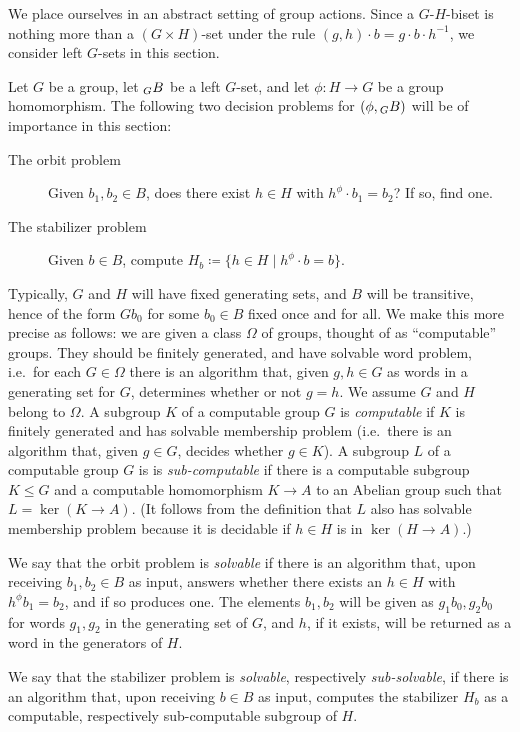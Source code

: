\documentclass{amsart}
\begin{document}
We place ourselves in an abstract setting of group actions. Since a
$G$-$H$-biset is nothing more than a $(G\times H)$-set under the rule
$(g,h)\cdot b=g\cdot b\cdot h^{-1}$, we consider left $G$-sets in this
section.

Let $G$ be a group, let $\subscript G B$ be a left $G$-set, and let
$\phi\colon H\to G$ be a group homomorphism. The following two
decision problems for $(\phi,\subscript G B)$ will be of importance in this
section:
\begin{description}
\item[The orbit problem] Given $b_1,b_2\in B$, does there exist $h\in H$
  with $h^\phi\cdot b_1=b_2$? If so, find one.
\item[The stabilizer problem] Given $b\in B$, compute
  $H_b\coloneqq\{h\in H\mid h^\phi\cdot b=b\}$.
\end{description}
Typically, $G$ and $H$ will have fixed generating sets, and $B$ will
be transitive, hence of the form $G b_0$ for some $b_0\in B$ fixed
once and for all.  We make this more precise as follows: we are given
a class $\Omega$ of groups, thought of as ``computable'' groups. They
should be finitely generated, and have solvable word problem, i.e.\
for each $G\in\Omega$ there is an algorithm that, given $g,h\in G$ as
words in a generating set for $G$, determines whether or not $g=h$. We
assume $G$ and $H$ belong to $\Omega$.  A subgroup $K$ of a computable
group $G$ is \emph{computable} if $K$ is finitely generated and has
solvable membership problem (i.e.\ there is an algorithm that, given
$g\in G$, decides whether $g\in K$). A subgroup $L$ of a computable
group $G$ is is \emph{sub-computable} if there is a computable
subgroup $K\le G$ and a computable homomorphism $K\to A$ to an Abelian
group such that $L=\ker(K\to A)$.  (It follows from the definition
that $L$ also has solvable membership problem because it is decidable
if $h\in H$ is in $\ker(H\to A)$.)

We say that the orbit problem is \emph{solvable} if there is an
algorithm that, upon receiving $b_1,b_2\in B$ as input, answers
whether there exists an $h\in H$ with $h^\phi b_1=b_2$, and if so
produces one. The elements $b_1,b_2$ will be given as $g_1b_0,g_2b_0$
for words $g_1,g_2$ in the generating set of $G$, and $h$, if it
exists, will be returned as a word in the generators of $H$.

We say that the stabilizer problem is \emph{solvable}, respectively
\emph{sub-solvable}, if there is an algorithm that, upon receiving
$b\in B$ as input, computes the stabilizer $H_b$ as a computable,
respectively sub-computable subgroup of $H$.
\end{document}
